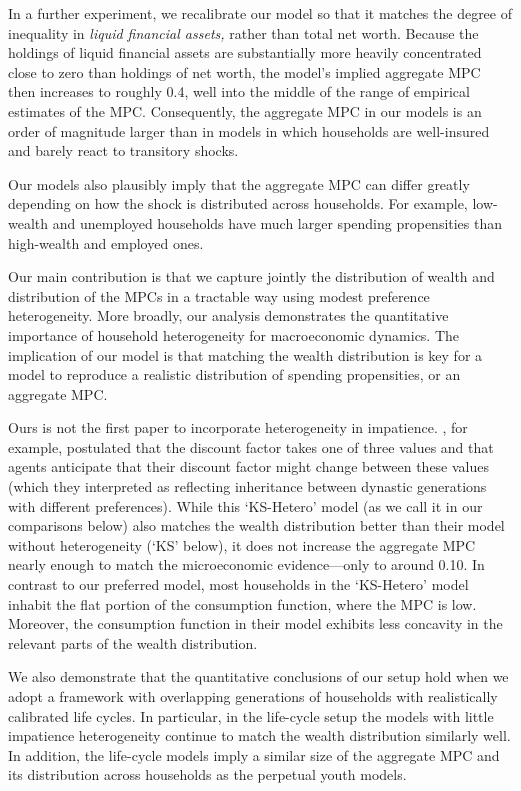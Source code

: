 \documentclass[12pt,titlepage]{econtex}
\begin{document}
In a further experiment, we recalibrate our model so that it matches
the degree of inequality in \emph{liquid financial assets,} rather
than total net worth.  Because the holdings of liquid financial assets
are substantially more heavily concentrated close
  to zero than holdings of net worth, the model's implied
aggregate MPC then increases to roughly 0.4, well into the middle of the
range of empirical estimates of the MPC. Consequently, the aggregate MPC in our models is an order of magnitude larger than in
 models in which households are well-insured and barely react to transitory shocks.

Our models also plausibly imply that the  aggregate MPC can differ greatly depending on how the shock is
  distributed across households. For example, low-wealth and unemployed households have much larger spending propensities than high-wealth and
  employed ones.

Our main contribution is that we capture jointly the distribution of wealth and distribution of the MPCs in a tractable way using modest preference heterogeneity. More broadly, our analysis demonstrates the quantitative importance of household heterogeneity for macroeconomic dynamics.  The implication of our model is that matching the wealth distribution is key for a model to reproduce a realistic distribution of spending propensities, or an aggregate MPC.

 Ours is not the first paper to incorporate heterogeneity in
impatience.  \citet{ksHetero}, for example, postulated that the discount factor
takes one of three values and that agents anticipate that their
discount factor might change between these values (which they
interpreted as reflecting inheritance between dynastic generations
with different preferences). While this `KS-Hetero' model (as we call
it in our comparisons below) also matches the wealth distribution
better than their model without heterogeneity (`KS' below), it does not increase
the aggregate MPC nearly enough to match the microeconomic
evidence---only to around 0.10. In contrast to our preferred model, most households in the `KS-Hetero' model inhabit the flat portion of
  the consumption function, where the MPC is low. Moreover, the
  consumption function in their model exhibits less concavity in the relevant parts of the wealth distribution.

We also demonstrate that the quantitative conclusions of our setup
  hold when we adopt a framework with overlapping generations of
  households with realistically calibrated life cycles.  In
  particular, in the life-cycle setup the models with little
  impatience heterogeneity continue to match the wealth distribution
  similarly well.  In addition, the life-cycle models imply a similar
  size of the aggregate MPC and its distribution across households as
  the perpetual youth models.
\end{document}
